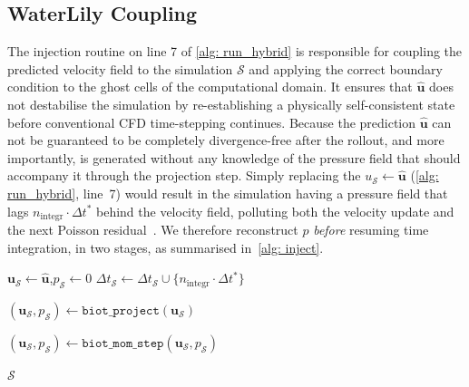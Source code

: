 \subsection{WaterLily Coupling}
\label{sect: coupling}

The injection routine on line 7 of \autoref{alg: run_hybrid} is responsible for coupling the predicted velocity field to the simulation $\mathcal{S}$ and applying the correct boundary condition to the ghost cells of the computational domain. It ensures that $\mathbf{\hat{u}}$ does not destabilise the simulation by re-establishing a physically self-consistent state before conventional CFD time-stepping continues. Because the prediction $\mathbf{\hat{u}}$ can not be guaranteed to be completely divergence-free after the rollout, and more importantly, is generated without any knowledge of the pressure field that should accompany it through the projection step. Simply replacing the $u_{\mathcal{S}} \leftarrow \hat{\mathbf{u}}$ (\autoref{alg: run_hybrid}, line~7) would result in the simulation having a pressure field that lags $n_\text{integr} \cdot \Delta t^*$ behind the velocity field, polluting both the velocity update and the next Poisson residual~\cite{Maertens2015}. We therefore reconstruct $p$ \emph{before} resuming time integration, in two stages, as summarised in~\autoref{alg: inject}.

\begin{algorithm}[H]
\SetAlgoLined
\DontPrintSemicolon
\caption{Velocity-field injection (\texttt{inject})}
\label{alg: inject}

\BlankLine
{}
$\mathbf{u}_{\mathcal{S}} \gets \hat{\mathbf{u}}$,\quad $p_{\mathcal{S}} \gets 0$\;
$\Delta t_{\mathcal{S}} \gets \Delta t_{\mathcal{S}} \cup \{n_\text{integr}\!\cdot\!\Delta t^*\}$\;

\BlankLine
{}
$(\mathbf{u}_{\mathcal{S}}, p_{\mathcal{S}}) \gets \texttt{biot\_project}(\mathbf{u}_{\mathcal{S}})$

\BlankLine
{}
$(\mathbf{u}_{\mathcal{S}}, p_{\mathcal{S}}) \gets \texttt{biot\_mom\_step}(\mathbf{u}_{\mathcal{S}}, p_{\mathcal{S}})$


\BlankLine
\Return $\mathcal{S}$
\end{algorithm}

